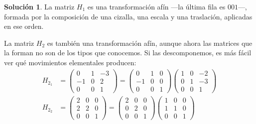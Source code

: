 \documentclass[a4paper, 11pt]{article}
\theoremstyle{definition}
\newtheorem*{solucion}{Solución}
\theoremstyle{theorem}
\begin{document}
  \begin{solucion}
      La matriz $H_1$ es una transformación afín ---la última fila es $0 0 1$---, formada por la composición de una cizalla, una escala y una traslación, aplicadas en ese orden.

      La matriz $H_2$ es también una transformación afín, aunque ahora las matrices que la forman no son de los tipos que conocemos. Si las descomponemos, es más fácil ver qué movimientos elementales producen:
      \begin{align*}
          H_{2_1} &= \left(
          \begin{array}{ccc}
              0 & 1 & -3 \\
              -1 & 0 & 2 \\
              0 & 0 & 1
          \end{array}
          \right) =
          \left(
          \begin{array}{ccc}
              0 & 1 & 0 \\
              -1 & 0 & 0 \\
              0 & 0 & 1
          \end{array}
          \right)
          \left(
          \begin{array}{ccc}
              1 & 0 & -2 \\
              0 & 1 & -3 \\
              0 & 0 & 1
          \end{array}
          \right) \\
          H_{2_2} &= \left(
          \begin{array}{ccc}
              2 & 0 & 0 \\
              2 & 2 & 0 \\
              0 & 0 & 1
          \end{array}
          \right) =
          \left(
          \begin{array}{ccc}
              2 & 0 & 0 \\
              0 & 2 & 0 \\
              0 & 0 & 1
          \end{array}
          \right)
          \left(
          \begin{array}{ccc}
              1 & 0 & 0 \\
              1 & 1 & 0 \\
              0 & 0 & 1
          \end{array}
          \right)
      \end{align*}


\end{solucion}
\end{document}
